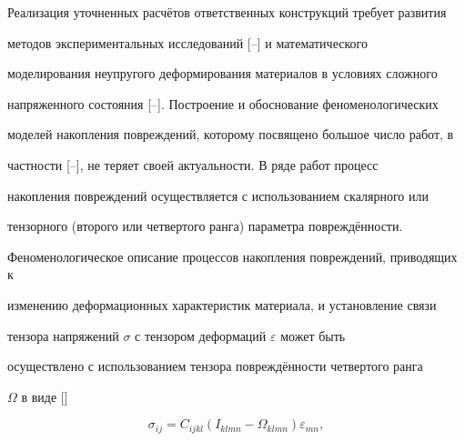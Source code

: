 


\date{07/VII/2012}




\maketitle





Реализация уточненных расчётов ответственных конструкций требует \linebreak развития

методов экспериментальных исследований [--] и математического

моделирования неупругого деформирования материалов в условиях сложного

напряженного состояния [--]. Построение и обоснование феноменологических

моделей накопления повреждений, которому посвящено большое число работ, в

частности [--], не теряет своей актуальности. В ряде работ процесс

накопления повреждений осуществляется с использованием скалярного или

тензорного (второго или четвертого ранга) параметра повреждённости.



Феноменологическое описание процессов накопления повреждений, приводящих к

изменению деформационных характеристик материала, и установление связи

тензора напряжений $\sigma$ с тензором деформаций $\varepsilon $ может быть

осуществлено с использованием тензора повреждённости четвертого ранга

$\Omega $ в виде []

\begin{equation}

\label{ipatova:eq1}

\sigma _{ij} =C_{ijkl} \left( I_{klmn} -\Omega _{klmn} \right)\varepsilon_{mn},

\end{equation}

